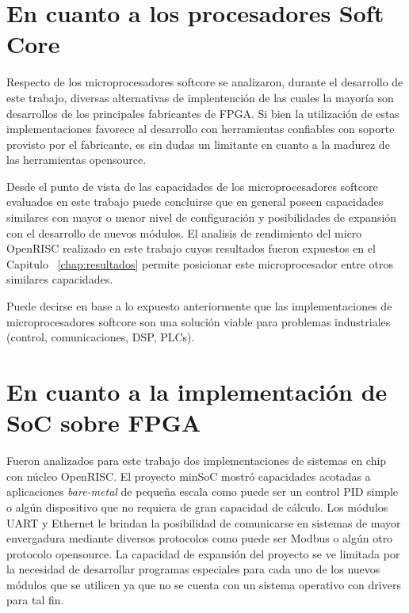 	\section{En cuanto a los procesadores Soft Core} 
	
Respecto de los microprocesadores softcore se analizaron, durante el desarrollo de este trabajo, diversas alternativas de implentención de las cuales
la mayoría son desarrollos de los principales fabricantes de FPGA. Si bien la utilización de estas implementaciones favorece al desarrollo con
herramientas confiables con soporte provisto por el fabricante, es sin dudas un limitante en cuanto a la madurez de las herramientas opensource.

Desde el punto de vista de las capacidades de los microprocesadores softcore evaluados en este trabajo puede concluirse que en general poseen
capacidades similares con mayor o menor nivel de configuración y posibilidades de expansión con el desarrollo de nuevos módulos. El analisis de
rendimiento del micro OpenRISC realizado en este trabajo cuyos resultados fueron expuestos en el Capitulo ~\ref {chap:resultados} permite posicionar
este microprocesador entre otros similares capacidades.

Puede decirse en base a lo expuesto anteriormente que las implementaciones de microprocesadores softcore son una solución viable para problemas
industriales (control, comunicaciones, DSP, PLCs). %
 
	\section{En cuanto a la implementación de SoC sobre FPGA} 

Fueron analizados para este trabajo dos implementaciones de sistemas en chip con núcleo OpenRISC. El proyecto minSoC mostró capacidades acotadas a
aplicaciones \textit{bare-metal} de pequeña escala como puede ser un control PID simple o algún dispositivo que no requiera de gran capacidad de
cálculo. Los módulos UART y Ethernet le brindan la posibilidad de comunicarse en sistemas de mayor envergadura mediante diversos protocolos como puede
ser Modbus o algún otro protocolo opensource. La capacidad de expansión del proyecto se ve limitada por la necesidad de desarrollar programas
especiales para cada uno de los nuevos módulos que se utilicen ya que no se cuenta con un sistema operativo con drivers para tal fin.

